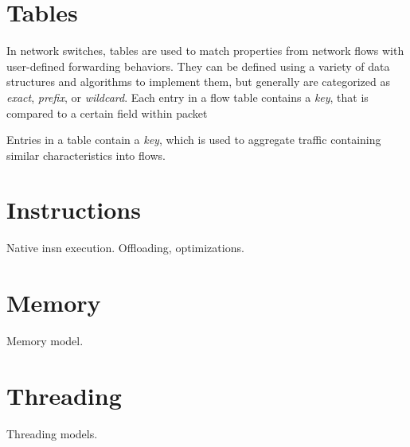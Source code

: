 \section{Tables}
\label{vm:tables}
In network switches, tables are used to match properties from network flows
with user-defined forwarding behaviors. They can be defined using a variety of
data structures and algorithms to implement them, but generally are categorized
as \emph{exact}, \emph{prefix}, or \emph{wildcard}. Each entry in a flow table
contains a \emph{key}, that is compared to a certain field within packet

Entries in a table contain a \emph{key}, which is used to aggregate traffic
containing similar characteristics into flows.


\section{Instructions}
\label{vm:insn}
Native insn execution. Offloading, optimizations.

\section{Memory}
\label{vm:memory}
Memory model.

\section{Threading}
\label{vm:threading}
Threading models.
